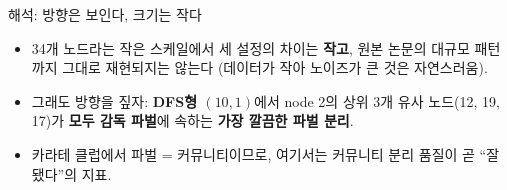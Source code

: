 \begin{frame}{해석: 방향은 보인다, 크기는 작다}
  \begin{itemize}
    \item 34개 노드라는 작은 스케일에서 세 설정의 차이는 \textbf{작고},
      원본 논문의 대규모 패턴까지 그대로 재현되지는 않는다
      (데이터가 작아 노이즈가 큰 것은 자연스러움).
    \item 그래도 방향을 짚자: \textbf{DFS형 $(10,1)$}에서 node 2의
      상위 3개 유사 노드(12, 19, 17)가 \textbf{모두 감독 파벌}에
      속하는 \textbf{가장 깔끔한 파벌 분리}.
    \item 카라테 클럽에서 파벌 = 커뮤니티이므로, 여기서는
      커뮤니티 분리 품질이 곧 ``잘 됐다''의 지표.
  \end{itemize}
\end{frame}
